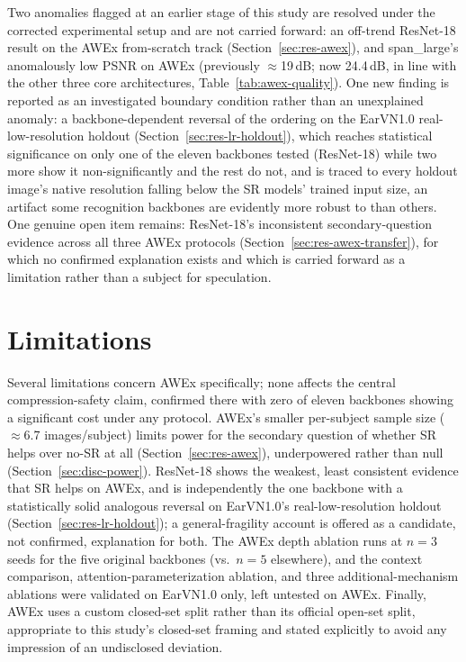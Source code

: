 \documentclass[pdflatex,sn-vancouver-num]{sn-jnl}
\begin{document}
Two anomalies flagged at an earlier stage of this study are resolved under the corrected experimental setup and are not carried forward: an off-trend ResNet-18 result on the AWEx from-scratch track (Section~\ref{sec:res-awex}), and span\_large's anomalously low PSNR on AWEx (previously $\approx$19\,dB; now 24.4\,dB, in line with the other three core architectures, Table~\ref{tab:awex-quality}). One new finding is reported as an investigated boundary condition rather than an unexplained anomaly: a backbone-dependent reversal of the ordering on the EarVN1.0 real-low-resolution holdout (Section~\ref{sec:res-lr-holdout}), which reaches statistical significance on only one of the eleven backbones tested (ResNet-18) while two more show it non-significantly and the rest do not, and is traced to every holdout image's native resolution falling below the SR models' trained input size, an artifact some recognition backbones are evidently more robust to than others. One genuine open item remains: ResNet-18's inconsistent secondary-question evidence across all three AWEx protocols (Section~\ref{sec:res-awex-transfer}), for which no confirmed explanation exists and which is carried forward as a limitation rather than a subject for speculation.

\section{Limitations}
\label{sec:limitations}

Several limitations concern AWEx specifically; none affects the central compression-safety claim, confirmed there with zero of eleven backbones showing a significant cost under any protocol. AWEx's smaller per-subject sample size ($\approx$6.7 images/subject) limits power for the secondary question of whether SR helps over no-SR at all (Section~\ref{sec:res-awex}), underpowered rather than null (Section~\ref{sec:disc-power}). ResNet-18 shows the weakest, least consistent evidence that SR helps on AWEx, and is independently the one backbone with a statistically solid analogous reversal on EarVN1.0's real-low-resolution holdout (Section~\ref{sec:res-lr-holdout}); a general-fragility account is offered as a candidate, not confirmed, explanation for both. The AWEx depth ablation runs at $n=3$ seeds for the five original backbones (vs.\ $n=5$ elsewhere), and the context comparison, attention-parameterization ablation, and three additional-mechanism ablations were validated on EarVN1.0 only, left untested on AWEx. Finally, AWEx uses a custom closed-set split rather than its official open-set split, appropriate to this study's closed-set framing and stated explicitly to avoid any impression of an undisclosed deviation.
\end{document}
